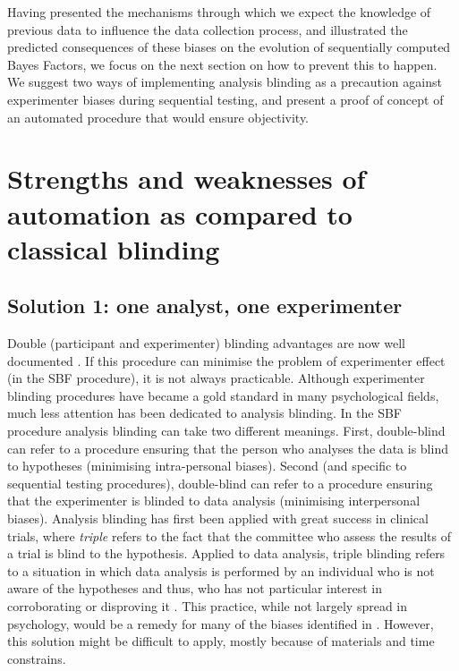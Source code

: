 \documentclass[a4paper,man,natbib,floatsintext,donotrepeattitle]{apa6}
\begin{document}
Having presented the mechanisms through which we expect the knowledge of previous data to influence the data collection process, and illustrated the predicted consequences of these biases on the evolution of sequentially computed Bayes Factors, we focus on the next section on how to prevent this to happen. We suggest two ways of implementing analysis blinding as a precaution against experimenter biases during sequential testing, and present a proof of concept of an automated procedure that would ensure objectivity.

\section{Strengths and weaknesses of automation as compared to classical blinding}

\subsection{Solution 1: one analyst, one experimenter}


Double (participant and experimenter) blinding advantages are now well documented \citep{schulz_blinding_2002}. If this procedure can minimise the problem of experimenter effect (in the SBF procedure), it is not always practicable. Although experimenter blinding procedures have became a gold standard in many psychological fields, much less attention has been dedicated to analysis blinding. In the SBF procedure analysis blinding can take two different meanings. First, double-blind can refer to a procedure ensuring that the person who analyses the data is blind to hypotheses (minimising intra-personal biases). Second (and specific to sequential testing procedures), double-blind can refer to a procedure ensuring that the experimenter is blinded to data analysis (minimising interpersonal biases). Analysis blinding has first been applied with great success in clinical trials, where \textit{triple} refers to the fact that the committee who assess the results of a trial is blind to the hypothesis. Applied to data analysis, triple blinding refers to a situation in which data analysis is performed by an individual who is not aware of the hypotheses and thus, who has not particular interest in corroborating or disproving it \citep{miller_blind_2011}. This practice, while not largely spread in psychology, would be a remedy for many of the biases identified in \cite{wicherts_degrees_2016}. However, this solution might be difficult to apply, mostly because of materials and time constrains.
\end{document}

